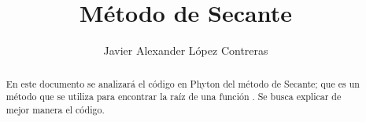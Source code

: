 \documentclass{rmf-d}
\begin{document}




\title{Método de Secante
\vspace{-6pt}}
\author{Javier Alexander López Contreras }

\address{Facultad de Ciencias Físico Matemáticas (FCFM), Universidad Autónoma de Coahuila, Campus Campo redondo }
\\

\maketitle




\begin{center}
\end{center}


\begin{abstract}
En este documento se analizará el código en Phyton del método de Secante; que es un método que se utiliza para encontrar la raíz de una función . Se busca explicar de mejor manera el código.
\end{abstract}
\end{document}
